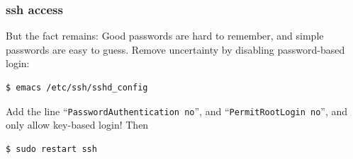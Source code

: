 \documentclass[9pt]{beamer}
\begin{document}
\begin{frame}[fragile]
\frametitle{ssh access}
But the fact remains: Good passwords are hard to remember, and simple passwords are easy to guess. Remove uncertainty by disabling password-based login:
\begin{verbatim}
$ emacs /etc/ssh/sshd_config
\end{verbatim}
Add the line ``\texttt{PasswordAuthentication no}'', and ``\texttt{PermitRootLogin no}'', and only allow key-based login!
Then 
\begin{verbatim}
$ sudo restart ssh
\end{verbatim}
\end{frame}
\end{document}
